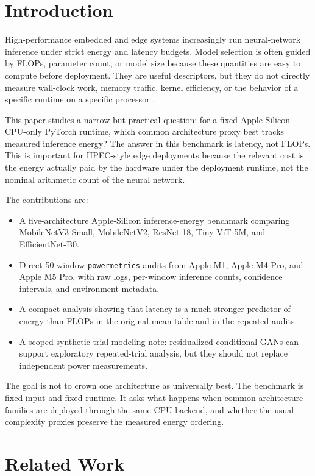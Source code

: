 \documentclass[conference]{IEEEtran}
\begin{document}
\section{Introduction}

High-performance embedded and edge systems increasingly run neural-network
inference under strict energy and latency budgets. Model selection is often
guided by FLOPs, parameter count, or model size because these quantities are
easy to compute before deployment. They are useful descriptors, but they do
not directly measure wall-clock work, memory traffic, kernel efficiency, or
the behavior of a specific runtime on a specific processor
\cite{horowitz2014,eyeriss2017,hardwareaware2019}.

This paper studies a narrow but practical question: for a fixed Apple Silicon
CPU-only PyTorch runtime, which common architecture proxy best tracks measured
inference energy? The answer in this benchmark is latency, not FLOPs. This is
important for HPEC-style edge deployments because the relevant cost is the
energy actually paid by the hardware under the deployment runtime, not the
nominal arithmetic count of the neural network.

The contributions are:
\begin{itemize}
\item A five-architecture Apple-Silicon inference-energy benchmark comparing
MobileNetV3-Small, MobileNetV2, ResNet-18, Tiny-ViT-5M, and EfficientNet-B0.
\item Direct 50-window \texttt{powermetrics} audits from Apple M1, Apple
M4 Pro, and Apple M5 Pro, with raw logs, per-window inference counts,
confidence intervals, and environment metadata.
\item A compact analysis showing that latency is a much stronger predictor of
energy than FLOPs in the original mean table and in the repeated audits.
\item A scoped synthetic-trial modeling note: residualized conditional GANs
can support exploratory repeated-trial analysis, but they should not replace
independent power measurements.
\end{itemize}

The goal is not to crown one architecture as universally best. The benchmark
is fixed-input and fixed-runtime. It asks what happens when common
architecture families are deployed through the same CPU backend, and whether
the usual complexity proxies preserve the measured energy ordering.

\section{Related Work}
\end{document}
